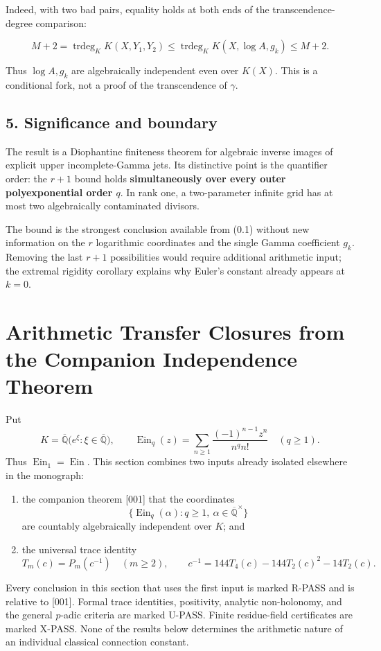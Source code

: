 \documentclass[11pt]{article}
\theoremstyle{keio}
\theoremstyle{definition}
\theoremstyle{remark}
\newcommand{\Qbar}{\overline{\mathbb Q}}
\newcommand{\Ein}{\operatorname{Ein}}
\newcommand{\UPASS}{\textcolor{keiogreen}{\textsf{U-PASS}}}
\newcommand{\XPASS}{\textcolor{keioxblue}{\textsf{X-PASS}}}
\newcommand{\RPASS}{\textcolor{keioxblue}{\textsf{R-PASS}}}
\begin{document}
Indeed, with two bad pairs, equality holds at both ends of the
transcendence-degree comparison:

\[
 M+2
 =\operatorname{trdeg}_K K(X,Y_1,Y_2)
 \leq\operatorname{trdeg}_K K(X,\log A,g_k)
 \leq M+2.
\]

Thus \(\log A,g_k\) are algebraically independent even over \(K(X)\).
This is a conditional fork, not a proof of the transcendence of
\(\gamma\).

\subsection{5. Significance and boundary}

The result is a Diophantine finiteness theorem for algebraic inverse images
of explicit upper incomplete-Gamma jets. Its distinctive point is the
quantifier order: the \(r+1\) bound holds \textbf{simultaneously over every outer
polyexponential order \(q\)}. In rank one, a two-parameter infinite grid
has at most two algebraically contaminated divisors.

The bound is the strongest conclusion available from (0.1) without new
information on the \(r\) logarithmic coordinates and the single Gamma
coefficient \(g_k\). Removing the last \(r+1\) possibilities would require
additional arithmetic input; the extremal rigidity corollary explains
why Euler's constant already appears at \(k=0\).
\section{Arithmetic Transfer Closures from the Companion Independence Theorem}
\label{sec:transfer-closures}

Put
\[
 K=\Qbar\bigl(e^\xi:\xi\in\Qbar\bigr),
 \qquad
 \Ein_q(z)=\sum_{n\ge1}\frac{(-1)^{n-1}z^n}{n^q n!}
 \quad(q\ge1).
\]
Thus \(\Ein_1=\Ein\).  This section combines two inputs already isolated
elsewhere in the monograph:

\begin{enumerate}
\item the companion theorem [001] that the coordinates
\[
 \{\Ein_q(\alpha):q\ge1,\ \alpha\in\Qbar^\times\}
\]
are countably algebraically independent over \(K\); and
\item the universal trace identity
\[
 T_m(c)=P_m(c^{-1})\quad(m\ge2),
 \qquad
 c^{-1}=144T_4(c)-144T_2(c)^2-14T_2(c).
\]
\end{enumerate}

\begin{statusbox}
Every conclusion in this section that uses the first input is marked
\RPASS{} and is relative to [001].  Formal trace identities, positivity,
analytic non-holonomy, and the general \(p\)-adic criteria are marked
\UPASS{}.  Finite residue-field certificates are marked \XPASS{}.  None of
the results below determines the arithmetic nature of an individual
classical connection constant.
\end{statusbox}
\end{document}
